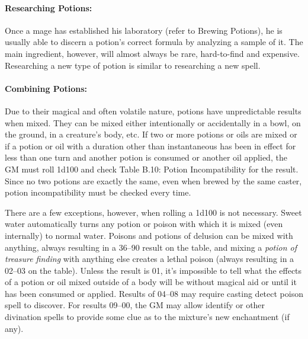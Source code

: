 \begin{multicols}{2}
\paragraph{Researching Potions:} Once a mage has established his laboratory (refer to Brewing Potions), he is usually able to discern a potion's correct formula by analyzing a sample of it.  The main ingredient, however, will almost always be rare, hard-to-find and expensive.  Researching a new type of potion is similar to researching a new spell.

\paragraph{Combining Potions:} Due to their magical and often volatile nature, potions have unpredictable results when mixed.  They can be mixed either intentionally or accidentally in a bowl, on the ground, in a creature's body, etc.  If two or more potions or oils are mixed or if a potion or oil with a duration other than instantaneous has been in effect for less than one turn and another potion is consumed or another oil applied, the GM must roll 1d100 and check Table B.10: Potion Incompatibility for the result.  Since no two potions are exactly the same, even when brewed by the same caster, potion incompatibility must be checked every time.  

 
There are a few exceptions, however, when rolling a 1d100 is not necessary.  Sweet water automatically turns any potion or poison with which it is mixed (even internally) to normal water.  Poisons and potions of delusion can be mixed with anything, always resulting in a 36--90 result on the table, and mixing a \textit{potion of treasure finding} with anything else creates a lethal poison (always resulting in a 02--03 on the table).  Unless the result is 01, it's impossible to tell what the effects of a potion or oil mixed outside of a body will be without magical aid or until it has been consumed or applied.  Results of 04--08 may require casting detect poison spell to discover.  For results 09--00, the GM may allow identify or other divination spells to provide some clue as to the mixture's new enchantment (if any).

\noindent
\begin{minipage}{\columnwidth}


\end{minipage}
\end{multicols}
